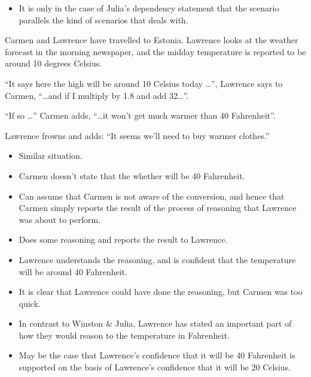 \documentclass[10pt]{article}
\newcommand{\hozlinedash}[0]{%
  \noindent\hdashrule[0.5ex][c]{\textwidth}{.1pt}{2.5pt}
}
\begin{document}
\begin{itemize}
\item It is only in the case of Julia's dependency statement that the scenario parallels the kind of scenarios that \citeauthor{Worsnip:2018aa} deals with.
\end{itemize}

\hozlinedash

\begin{scenario}
  Carmen and Lawrence have travelled to Estonia.
  Lawrence looks at the weather forecast in the morning newspaper, and the midday temperature is reported to be around 10 degrees Celsius.

  ``It says here the high will be around 10 Celsius today \dots'', Lawrence says to Carmen, ``\dots and if I multiply by 1.8 and add 32\dots''.

  ``If so \dots'' Carmen adds, ``\dots it won't get much warmer than 40 Fahrenheit''.

  Lawrence frowns and adds: ``It seems we'll need to buy warmer clothes.''
\end{scenario}

\begin{itemize}
\item Similar situation.
\item Carmen doesn't state that the whether will be 40 Fahrenheit.
\item Can assume that Carmen is not aware of the conversion, and hence that Carmen simply reports the result of the process of reasoning that Lawrence was about to perform.
\item Does some reasoning and reports the result to Lawrence.
\item Lawrence understands the reasoning, and is confident that the temperature will be around 40 Fahrenheit.
\item It is clear that Lawrence could have done the reasoning, but Carmen was too quick.
\item In contrast to Winston \& Julia, Lawrence has stated an important part of how they would reason to the temperature in Fahrenheit.
\item May be the case that Lawrence's confidence that it will be 40 Fahrenheit is supported on the basis of Lawrence's confidence that it will be 20 Celsius.
\end{itemize}
\end{document}
